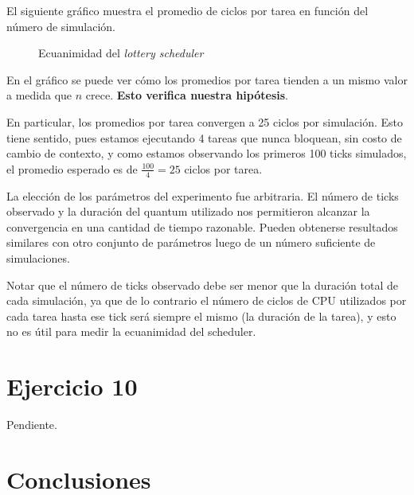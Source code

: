 \documentclass[a4paper,10pt,twoside]{article}
\begin{document}
El siguiente gráfico muestra el promedio de ciclos por tarea en función del número de simulación.

\begin{figure}[H]
	\centering
	
	\caption{Ecuanimidad del \textit{lottery scheduler}}
\end{figure}

En el gráfico se puede ver cómo los promedios por tarea tienden a un mismo valor a medida que $n$ crece. \textbf{Esto verifica nuestra hipótesis}.

En particular, los promedios por tarea convergen a 25 ciclos por simulación. Esto tiene sentido, pues estamos ejecutando 4 tareas que nunca bloquean, sin costo de cambio de contexto, y como estamos observando los primeros 100 ticks simulados, el promedio esperado es de $\frac{100}{4} = 25$ ciclos por tarea.

La elección de los parámetros del experimento fue arbitraria. El número de ticks observado y la duración del quantum utilizado nos permitieron alcanzar la convergencia en una cantidad de tiempo razonable. Pueden obtenerse resultados similares con otro conjunto de parámetros luego de un número suficiente de simulaciones.

Notar que el número de ticks observado debe ser menor que la duración total de cada simulación, ya que de lo contrario el número de ciclos de CPU utilizados por cada tarea hasta ese tick será siempre el mismo (la duración de la tarea), y esto no es útil para medir la ecuanimidad del scheduler.




\section{Ejercicio 10}

Pendiente.




\section{Conclusiones}
\end{document}
